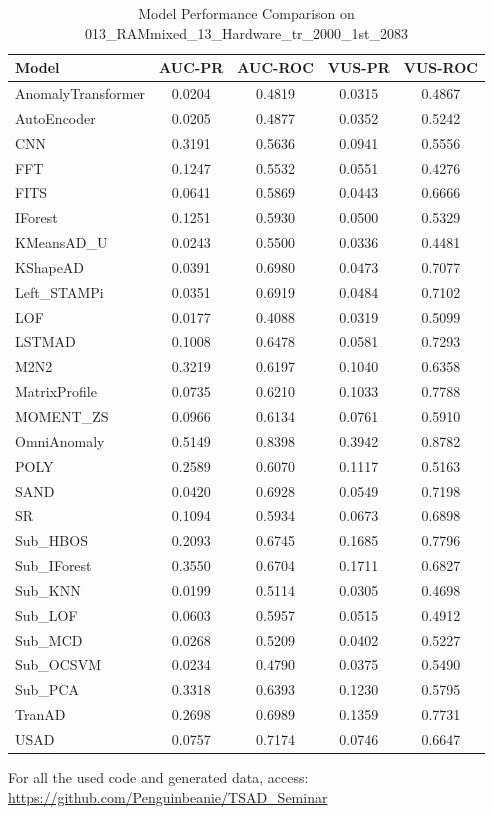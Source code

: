 \documentclass[12pt,oneside]{article}
\begin{document}
\begin{table}[H]
    \centering
    \caption{Model Performance Comparison on 013\_RAMmixed\_13\_Hardware\_tr\_2000\_1st\_2083}
    \begin{tabular}{|l|c|c|c|c|}
        \toprule
        \textbf{Model} & \textbf{AUC-PR} & \textbf{AUC-ROC} & \textbf{VUS-PR} & \textbf{VUS-ROC} \\
        \midrule
        AnomalyTransformer & 0.0204 & 0.4819 & 0.0315 & 0.4867 \\
        AutoEncoder & 0.0205 & 0.4877 & 0.0352 & 0.5242 \\
        CNN & 0.3191 & 0.5636 & 0.0941 & 0.5556 \\
        FFT & 0.1247 & 0.5532 & 0.0551 & 0.4276 \\
        FITS & 0.0641 & 0.5869 & 0.0443 & 0.6666 \\
        IForest & 0.1251 & 0.5930 & 0.0500 & 0.5329 \\
        KMeansAD\_U & 0.0243 & 0.5500 & 0.0336 & 0.4481 \\
        KShapeAD & 0.0391 & 0.6980 & 0.0473 & 0.7077 \\
        Left\_STAMPi & 0.0351 & 0.6919 & 0.0484 & 0.7102 \\
        LOF & 0.0177 & 0.4088 & 0.0319 & 0.5099 \\
        LSTMAD & 0.1008 & 0.6478 & 0.0581 & 0.7293 \\
        M2N2 & 0.3219 & 0.6197 & 0.1040 & 0.6358 \\
        MatrixProfile & 0.0735 & 0.6210 & 0.1033 & 0.7788 \\
        MOMENT\_ZS & 0.0966 & 0.6134 & 0.0761 & 0.5910 \\
        OmniAnomaly & 0.5149 & 0.8398 & 0.3942 & 0.8782 \\
        POLY & 0.2589 & 0.6070 & 0.1117 & 0.5163 \\
        SAND & 0.0420 & 0.6928 & 0.0549 & 0.7198 \\
        SR & 0.1094 & 0.5934 & 0.0673 & 0.6898 \\
        Sub\_HBOS & 0.2093 & 0.6745 & 0.1685 & 0.7796 \\
        Sub\_IForest & 0.3550 & 0.6704 & 0.1711 & 0.6827 \\
        Sub\_KNN & 0.0199 & 0.5114 & 0.0305 & 0.4698 \\
        Sub\_LOF & 0.0603 & 0.5957 & 0.0515 & 0.4912 \\
        Sub\_MCD & 0.0268 & 0.5209 & 0.0402 & 0.5227 \\
        Sub\_OCSVM & 0.0234 & 0.4790 & 0.0375 & 0.5490 \\
        Sub\_PCA & 0.3318 & 0.6393 & 0.1230 & 0.5795 \\
        TranAD & 0.2698 & 0.6989 & 0.1359 & 0.7731 \\
        USAD & 0.0757 & 0.7174 & 0.0746 & 0.6647 \\
        \bottomrule
    \end{tabular}
    
    \label{tab:model_performance_RAMmixed}
\end{table}

For all the used code and generated data, access: \url{https://github.com/Penguinbeanie/TSAD_Seminar}


\end{document}
